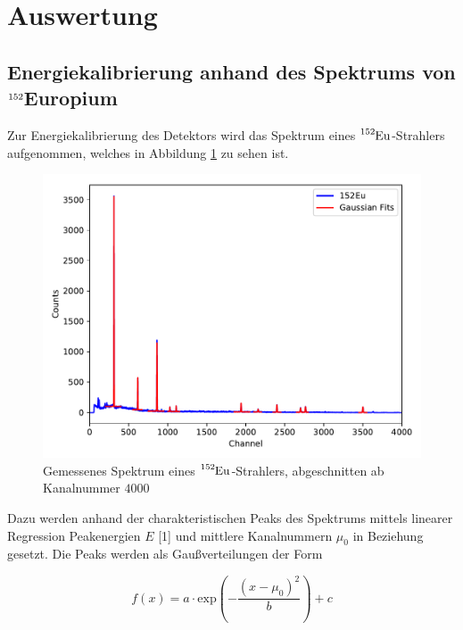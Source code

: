\section{Auswertung}
\label{sec:Auswertung}


\subsection{Energiekalibrierung anhand des Spektrums von $\ce{^{152}}$Europium}

Zur Energiekalibrierung des Detektors wird das Spektrum eines $\ce{^{152}Eu}$-Strahlers aufgenommen, welches in Abbildung
\ref{fig:plot1} zu sehen ist.

\begin{figure}
  \centering
  \includegraphics[scale=0.7]{content/plot1.pdf}
  \caption{Gemessenes Spektrum eines $\ce{^{152}Eu}$-Strahlers, abgeschnitten ab Kanalnummer $\num{4000}$}
  \label{fig:plot1}
\end{figure}

Dazu werden anhand der charakteristischen Peaks des Spektrums mittels linearer Regression Peakenergien $E$ [1] und mittlere 
Kanalnummern $\mu_0$ in Beziehung gesetzt.
Die Peaks werden als Gaußverteilungen der Form 

\begin{equation}
  f(x) = a \cdot \text{exp}\left( - \frac{(x-\mu_0)^2}{b}\right) + c
  \label{eqn:gauss}
\end{equation}

